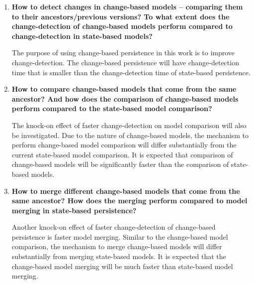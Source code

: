 \documentclass[12pt, a4paper]{report} \usepackage[titletoc]{appendix}
\begin{document}
\begin{enumerate}
    \item \textbf{How to detect changes in change-based models -- comparing them to their ancestors/previous versions? To what extent does the change-detection of change-based models perform compared to change-detection in state-based models?} 
        
    The purpose of using change-based persistence in this work is to improve change-detection. The change-based persistence will have change-detection time that is smaller than the change-detection time of state-based persistence.        
	
	\item \textbf{How to compare change-based models that come from the same ancestor? And how does the comparison of change-based models perform compared to the state-based model comparison?} 
	
	The knock-on effect of faster change-detection on model comparison will also be investigated. Due to the nature of change-based models, the mechanism to perform change-based model comparison will differ substantially from the current state-based model comparison. It is expected that comparison of change-based models will be significantly faster than the comparison of state-based models.   
	
	\item \textbf{How to merge different change-based models that come from the same ancestor? How does the merging perform compared to model merging in state-based persistence?}
	
    Another knock-on effect of faster change-detection of change-based persistence is faster model merging. Similar to the change-based model comparison, the mechanism to merge change-based models will differ substantially from merging state-based models. It is expected that the change-based model merging will be much faster than state-based model merging.   
	
\end{enumerate}
\end{document}
